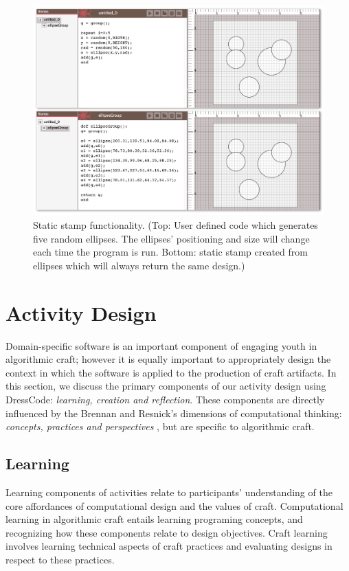 \documentclass{sigchi}
\begin{document}
\begin{center}
\begin{figure}[h!]
\includegraphics[width=\columnwidth]{images/stamps.jpg}
\caption{Static stamp functionality. (Top: User defined code which generates five random ellipses. The ellipses' positioning and size will change each time the program is run. Bottom: static stamp created from ellipses which will always return the same design.)}
\label{fig:stamps}
\end{figure}
\end{center}
\vspace{-20pt}

\section{Activity Design}
Domain-specific software is an important component of engaging youth in algorithmic craft; however it is equally important to appropriately design the context in which the software is applied to the production of craft artifacts. In this section, we discuss the primary components of our activity design using DressCode: \emph{learning, creation and reflection}. These components are directly influenced by the Brennan and Resnick's dimensions of computational thinking: \emph{concepts, practices and perspectives} \cite{computational_thinking}, but are specific to algorithmic craft.

\subsection{Learning}
Learning components of activities relate to participants' understanding of the core affordances of computational design and the values of craft. Computational learning in algorithmic craft entails learning programing concepts, and recognizing how these components relate to design objectives. Craft learning involves learning technical aspects of craft practices and evaluating designs in respect to these practices.
\end{document}
